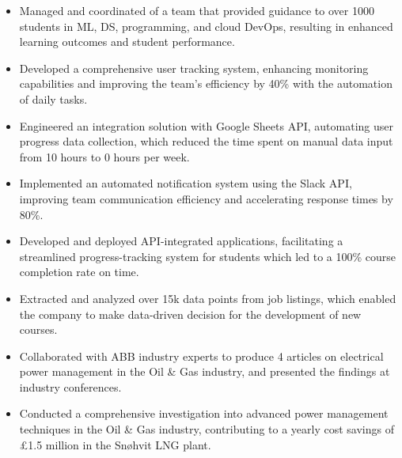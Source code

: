 \documentclass[10pt,a4paper,ragged2e,withhyper]{altacv}
\begin{document}
\begin{paracol}{2}
            \begin{itemize}
                \item Managed and coordinated of a team that provided guidance to over 1000 students in ML, DS, programming, and cloud DevOps, resulting in enhanced learning outcomes and student performance.
                \item Developed a comprehensive user tracking system, enhancing monitoring capabilities and improving the team's efficiency by 40\% with the automation of daily tasks.
                \item Engineered an integration solution with Google Sheets API, automating user progress data collection, which reduced the time spent on manual data input from 10 hours to 0 hours per week.
                \item Implemented an automated notification system using the Slack API, improving team communication efficiency and accelerating response times by 80\%.
                \item Developed and deployed API-integrated applications, facilitating a streamlined progress-tracking system for students which led to a 100\% course completion rate on time.
                \item Extracted and analyzed over 15k data points from job listings, which enabled the company to make data-driven decision for the development of new courses.
            \end{itemize}
            \customdivider

            \begin{itemize}
                \item Collaborated with ABB industry experts to produce 4 articles on electrical power management in the Oil \& Gas industry, and presented the findings at industry conferences.
                \item Conducted a comprehensive investigation into advanced power management techniques in the Oil \& Gas industry, contributing to a yearly cost savings of £1.5 million in the Snøhvit LNG plant.
            \end{itemize}
        \newpage
        

\end{paracol}
\end{document}
